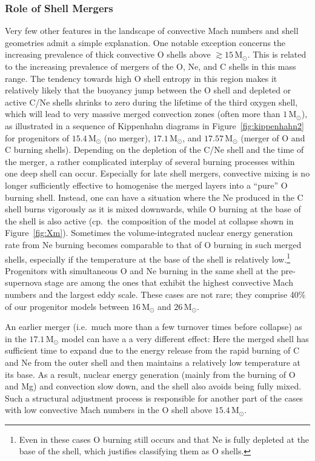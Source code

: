 \documentclass[useAMS,usenatbib]{mnras}
\newcommand{\Msun}{\ensuremath{\mathrm{M}_\odot}}
\begin{document}
\subsubsection{Role of Shell Mergers}
\label{sec:merger}

Very few other features in the landscape of convective Mach numbers
and shell geometries admit a simple explanation. One notable exception
concerns the increasing prevalence of thick convective O shells above
$\gtrsim 15 \,\Msun$. This is related to the increasing prevalence of
mergers of the O, Ne, and C shells in this mass range. The tendency
towards high O shell entropy in this region makes it relatively likely
that the buoyancy jump between the O shell and depleted or active C/Ne
shells shrinks to zero during the lifetime of the third oxygen shell,
which will lead to very massive merged convection zones (often more
than $1 \,\Msun$), as illustrated in a sequence of Kippenhahn diagrams
in Figure~\ref{fig:kippenhahn2} for progenitors of $15.4 \,\Msun$ (no
merger), $17.1 \,\Msun$, and $17.57 \,\Msun$ (merger of O and C
burning shells).  Depending on the depletion of the C/Ne shell and the
time of the merger, a rather complicated interplay of several burning
processes within one deep shell can occur.  Especially for late shell
mergers, convective mixing is no longer sufficiently effective to
homogenise the merged layers into a ``pure'' O burning shell. Instead,
one can have a situation where the Ne produced in the C shell
burns vigorously as it is mixed downwards, while O burning at the base
of the shell is also active (cp.\ the composition of the model at
  collapse shown in Figure~\ref{fig:Xm}). Sometimes the
volume-integrated nuclear energy generation rate from Ne burning
becomes comparable to that of O burning in such merged shells,
especially if the temperature at the base of the shell is relatively
low.\footnote{Even in these cases O burning still occurs and that Ne
  is fully depleted at the base of the shell, which justifies
  classifying them as O shells.}  Progenitors with simultaneous O and
Ne burning in the same shell at the pre-supernova stage are among the
ones that exhibit the highest convective Mach numbers and the largest
eddy scale. These cases are not rare; they comprise 40\% of our
progenitor models between $16\,\Msun$ and $26 \,\Msun$.

An earlier merger (i.e.\ much more than a few turnover times before
collapse) as in the $17.1 \,\Msun$ model can have a a very different
effect: Here the merged shell has sufficient time to expand due to the
energy release from the rapid burning of C and Ne from the outer shell
and then maintains a relatively low temperature at its base.  As a
result, nuclear energy generation (mainly from the burning of O and
Mg) and convection slow down, and the shell also avoids being fully
mixed. Such a structural adjustment process is responsible for another
part of the cases with low convective Mach numbers in the O shell
above $15.4\, \Msun$.
\end{document}
